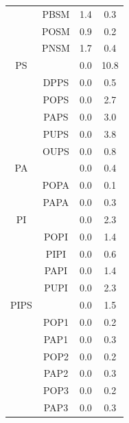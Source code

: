 \documentclass[12pt]{ruthesis_nofloat}
\begin{document}
\begin{table}
{\begin{tabular}{|c||c|cc|}
{} &PBSM                         & 1.4      & 0.3                           \\
{} &POSM                         & 0.9      & 0.2                           \\
{} &PNSM                         & 1.7     & 0.4                           \\
\hline
\hline
PS &{} &0.0&10.8\\ \hline
{} &DPPS                         & 0.0      & 0.5                           \\
{} &POPS                         & 0.0      & 2.7                           \\
{} &PAPS                         & 0.0      & 3.0                           \\
{} &PUPS                         & 0.0      & 3.8   			\\      
{} &OUPS                         & 0.0      & 0.8                           \\
\hline       
\hline          
PA &{} &0.0&0.4\\ \hline
{} &POPA                         & 0.0      & 0.1                          \\
{} &PAPA                         & 0.0      & 0.3                           \\
\hline
\hline
PI &{} &0.0&2.3\\ \hline
{} &POPI                         & 0.0      & 1.4                         \\
{} &PIPI                         & 0.0      & 0.6                           \\
{} &PAPI                         & 0.0      & 1.4                           \\
{} &PUPI                         & 0.0      & 2.3                           \\
\hline
\hline
PIPS &{} &0.0&1.5\\ \hline
{} &POP1                         & 0.0      & 0.2                           \\
{} &PAP1                         & 0.0      & 0.3                           \\
{} &POP2                         & 0.0      & 0.2                           \\
{} &PAP2                         & 0.0      & 0.3                           \\
{} &POP3                         & 0.0      & 0.2                           \\
{} &PAP3                         & 0.0      & 0.3                           \\
\hline
\end{tabular}}
\end{table}
\end{document}

